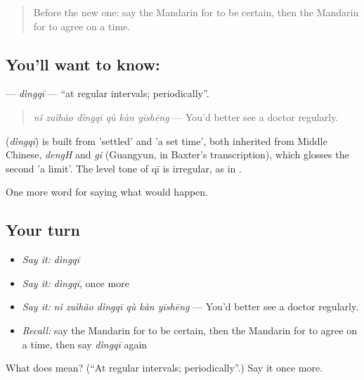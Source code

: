 \label{lesson:ZH-C390-dingqi}



\begin{quote}
Before the new one: say the Mandarin for to be certain, then the Mandarin for to agree on a time.
\end{quote}

\subsection*{You'll want to know: }
\textbf{} — \emph{dìngqī} — \textquotedblleft{}at regular intervals; periodically\textquotedblright{}.

\begin{quote}
\textbf{} \emph{nǐ zuìhǎo dìngqī qù kàn yīshēng} — You'd better see a doctor regularly.
\end{quote}

\begin{cousinweb}
\textbf{} (\emph{dìngqī}) is built from  'settled' and  'a set time', both inherited from Middle Chinese, \emph{dengH} and \emph{gi} (Guangyun, in Baxter's transcription), which glosses the second 'a limit'. The level tone of qī is irregular, as in .
\end{cousinweb}

\begin{grammarlens}[title={What you've built}]
One more word for saying what would happen.
\end{grammarlens}

\subsection*{Your turn}
\begin{itemize}
\raggedright
  \item \emph{Say it:} \emph{dìngqī}
  \item \emph{Say it:} \emph{dìngqī}, once more
  \item \emph{Say it:} \emph{nǐ zuìhǎo dìngqī qù kàn yīshēng} — You'd better see a doctor regularly.
  \item \emph{Recall:} say the Mandarin for to be certain, then the Mandarin for to agree on a time, then say \emph{dìngqī} again
\end{itemize}

\begin{tcolorbox}[breakable,colback=teal!4,colframe=teal!35!black,title={Before you move on}]
What does  mean? (\textquotedblleft{}At regular intervals; periodically\textquotedblright{}.) Say it once more.
\end{tcolorbox}
